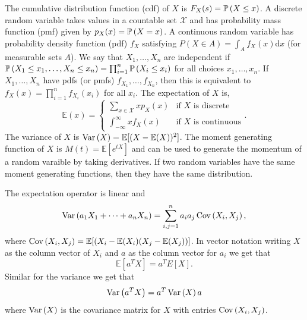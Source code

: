 \documentclass{article}
\begin{document}
The cumulative distribution function (cdf) of $ X $ is $ F_X(s)=\mathbb{P}\left({X\le x}\right) $. A discrete random variable takes values in a countable set $ \mathcal X $ and has probability mass function (pmf) given by $ p_X(x)=\mathbb{P}\left({X=x}\right) $. A continuous random variable has probability density function (pdf) $ f_X $ satisfying $ P(X\in A)=\int_A f_X(x)\mathrm dx $ (for measurable sets $ A $). We say that $ X_1,\dots, X_n $ are independent if $ \mathbb{P}\left({X_1\le x_1,\dots, X_n\le x_n}\right)=\prod_{i=1}^n \mathbb{P}\left({X_i\le x_i}\right) $ for all choices $ x_1,\dots, x_n $. If $ X_1,\dots, X_n $ have pdfs (or pmfs) $ f_{X_1},\dots, f_{X_n} $, then this is equivalent to $ f_X(x)=\prod_{i=1}^nf_{X_i}(x_i) $ for all $ x_i $. The expectation of $ X $ is,
\[
  \mathbb E(x)=\begin{cases}
	  \sum_{x\in \mathcal X}xp_X(x) & \text{if } X\text{ is discrete}\\
	  \int_{-\infty}^\infty xf_X(x) & \text{if } X\text{ is continuous}
  \end{cases}.
\]
The variance of $ X $ is $ \operatorname{Var}\left({X}\right)=\mathbb E[(X-\mathbb E(X))^2]$. The moment generating function of $ X $ is $ M(t)=\mathbb E[e^{tX}] $ and can be used to generate the momentum of a random varaible by taking derivatives. If two random variables have the same moment generating functions, then they have the same distribution.\par
The expectation operator is linear and
\[
	\operatorname{Var}\left({a_1X_1+\dots+a_nX_n}\right)=\sum_{i,j=1}^n a_ia_j\operatorname{Cov}\left({X_i,X_j}\right),
\]
where $ \operatorname{Cov}\left({X_i,X_j}\right)=\mathbb E[(X_i-\mathbb E(X_i)(X_j-\mathbb E(X_j))] $. In vector notation writing $ X $ as the column vector of $ X_i $ and $ a $ as the column vector for $ a_i $ we get that 
\[
	\mathbb E[a^T X]=a^T E[X].
\]
Similar for the variance we get that
\[
	\operatorname{Var}\left({a^TX}\right)=a^T\operatorname{Var}\left({X}\right) a
\]
where $ \operatorname{Var}\left({X}\right) $ is the covariance matrix for $ X $ with entries $ \operatorname{Cov}\left({X_i,X_j}\right) $.
\end{document}
